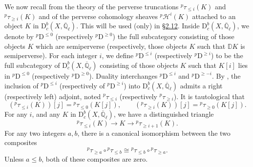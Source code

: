 We now recall from \cite[1.3]{BBD} the theory of the perverse truncations
\({}^p\tau_{\leq i}(K)\) and \({}^p\tau_{\geq i}(K)\) and of the perverse
cohomology sheaves \({}^p\mathcal{H}^i(K)\) attached to an object \(K\) in
\(\mathrm{D}^b_c(X,\overline{\mathbb{Q}}_\ell)\). This will be used (only) in
\hyperref[sec:2.12]{\S2.12}. Inside \(\mathrm{D}^b_c(X,\overline{\mathbb{Q}}_\ell)\), we
denote by \({}^p\mathrm{D}^{\leq 0}\) (respectively
\({}^p\mathrm{D}^{\geq 0}\)) the full subcategory consisting of those objects
\(K\) which are semiperverse (respectively, those objects \(K\) such that
\(\mathbb{D}K\) is semiperverse). For each integer \(i\), we define
\({}^p\mathrm{D}^{\leq i}\) (respectively \({}^p\mathrm{D}^{\geq i}\)) to be
the full subcategory of \(\mathrm{D}^b_c(X,\overline{\mathbb{Q}}_\ell)\)
consisting of those objects \(K\) such that \(K[i]\) lies in
\({}^p\mathrm{D}^{\leq 0}\) (respectively \({}^p\mathrm{D}^{\geq 0}\)).
Duality interchanges \({}^p\mathrm{D}^{\leq i}\) and
\({}^p\mathrm{D}^{\geq -i}\). By \cite[1.3.3]{BBD}, the inclusion of
\({}^p\mathrm{D}^{\leq i}\) (respectively of \({}^p\mathrm{D}^{\geq i}\)) into
\(\mathrm{D}^b_c(X,\overline{\mathbb{Q}}_\ell)\) admits a right
(respectively left) adjoint, noted \({}^p\tau_{\leq i}\) (respectively
\({}^p\tau_{\geq i}\)). It is tautological that
\[
  ({}^p\tau_{\leq i}(K))[j]={}^p\tau_{\leq 0}(K[j]),\qquad
  ({}^p\tau_{\geq i}(K))[j]={}^p\tau_{\geq 0}(K[j]).
\]
For any \(i\), and any \(K\) in
\(\mathrm{D}^b_c(X,\overline{\mathbb{Q}}_\ell)\), we have a distinguished
triangle
\[
  {}^p\tau_{\leq i}(K)\to K\to{}^p\tau_{\geq i+1}(K).
\]
For any two integers \(a,b\), there is a canonical isomorphism
\cite[1.3.5]{BBD} between the two composites
\[
  {}^p\tau_{\geq a}\circ{}^p\tau_{\leq b}
  \cong
  {}^p\tau_{\leq b}\circ{}^p\tau_{\geq a}.
\]
Unless \(a\leq b\), both of these composites are zero.

